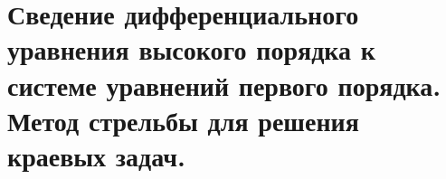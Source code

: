 \documentclass[../../calc-math-exam-2023.tex]{subfiles}
\begin{document}
    \section{Сведение дифференциального уравнения высокого порядка к системе уравнений первого порядка. Метод стрельбы для решения краевых задач.}\label{sec:ch29}
\end{document}
